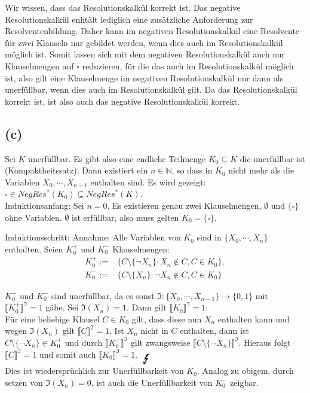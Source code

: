 \documentclass[11pt, a4paper]{article}
\begin{document}
Wir wissen, dass das Resolutionskalkül korrekt ist.
Das negative Resolutionskalkül enhtält lediglich eine zusätzliche Anforderung zur Resolventenbildung.
Daher kann im negativen Resolutionskalkül eine Resolvente für zwei Klauseln nur gebildet werden, wenn dies auch im Resolutionskalkül möglich ist.
Somit lassen sich mit dem negativen Resolutionskalkül auch nur Klauselmengen auf $\square$ reduzieren, für die das auch im Resolutionskalkül möglich ist, also gilt eine Klauselmenge im negativen Resolutionskalkül nur dann als unerfüllbar, wenn dies auch im Resolutionskalkül gilt.
Da das Resolutionskalkül korrekt ist, ist also auch das negative Resolutionskalkül korrekt.

\subsection*{(c)}
Sei $K$ unerfüllbar.
Es gibt also eine endliche Teilmenge $K_0 \subseteq K$ die unerfüllbar ist (Kompaktheitssatz).
Dann existiert ein $n \in \mathbb{N}$, so dass in $K_0$ nicht mehr als die Variablen $X_0, \cdots, X_{n-1}$ enthalten sind.
Es wird gezeigt: $\square \in NegRes^*(K_0) \subseteq NegRes^*(K)$.
\\

Induktionsanfang:
Sei $n=0$. Es existieren genau zwei Klauselmengen, $\emptyset$ und $\{\square\}$ ohne Variablen.
$\emptyset$ ist erfüllbar, also muss gelten $K_0 = \{\square\}$.

Induktionsschritt:
Annahme: Alle Variablen von $K_0$ sind in $\{X_0, \cdots, X_n\}$ enthalten.
Seien $K_0^+$ und $K_0^-$ Klauselmengen:
\begin{align*}
    K_0^+ :=& \{ C \setminus \{ \neg X_n \}: X_n \notin C, C \in K_0 \},\\
    K_0^- :=& \{ C \setminus \{ X_n \}: \neg X_n \notin C, C \in K_0 \}
\end{align*}

$K_0^+$ und $K_0^-$ sind unerfüllbar, da es sonst $\mathfrak{I}:\{X_0,\cdots,X_{n-1}\} \rightarrow \{0,1\}$ mit $\llbracket K_0^+ \rrbracket^\mathfrak{I} = 1$ gäbe.
Sei $\mathfrak{I}(X_n) = 1$. Dann gilt $\llbracket K_0 \rrbracket^\mathfrak{I} = 1$:\\
Für eine beliebige Klausel $C \in K_0$ gilt, dass diese nun $X_n$ enthalten kann und wegen $\mathfrak{I}(X_n)$ gilt $\llbracket C \rrbracket^\mathfrak{I} = 1$.
Ist $X_n$ nicht in $C$ enthalten, dann ist $C \setminus \{ \neg X_n \} \in K_0^+$ und durch $\llbracket K_0^+ \rrbracket^\mathfrak{I}$ gilt zwangsweise $\llbracket C \setminus \{ \neg X_n \} \rrbracket^\mathfrak{I}$.
Hieraus folgt $\llbracket C \rrbracket^\mathfrak{I} = 1$ und somit auch $\llbracket K_0 \rrbracket^\mathfrak{I} = 1$. $\;_\text{\LARGE\Lightning}$\\
Dies ist wiedersprüchlich zur Unerfüllbarkeit von $K_0$.
Analog zu obigem, durch setzen von $\mathfrak{I}(X_n) = 0$, ist auch die Unerfüllbarkeit von $K_0^-$ zeigbar.
\end{document}
